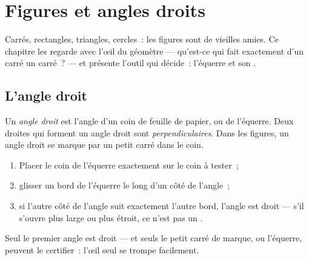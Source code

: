 \chapter{Figures et angles droits}\label{ch:g3:shapes}

Carrés, rectangles, triangles, cercles~: les figures sont de
vieilles amies. Ce chapitre les regarde avec l'œil du
géomètre --- qu'est-ce qui fait exactement d'un carré un
carré~? --- et présente l'outil qui décide~: l'équerre et
son .

\section{L'angle droit}

\begin{definition}\label{def:g3:shapes:rightangle}
Un \emph{angle droit} est l'angle d'un coin de
feuille de papier, ou de l'équerre. Deux droites qui forment un
angle droit sont \emph{perpendiculaires}. Dans les figures, un angle
droit se marque par un petit carré dans le coin.
\end{definition}

\begin{method}\label{met:g3:shapes:check}
\begin{enumerate}
  \item Placer le coin de l'équerre exactement sur le coin à
        tester~;
  \item glisser un bord de l'équerre le long d'un côté de
        l'angle~;
  \item si l'autre côté de l'angle suit exactement l'autre bord,
        l'angle est droit --- s'il s'ouvre plus large ou plus
        étroit, ce n'est pas un .
\end{enumerate}
\end{method}

\begin{omfigure}

{\small Seul le premier angle est droit --- et seuls le petit carré
de marque, ou l'équerre, peuvent le certifier~: l'œil seul se
trompe facilement.}
\end{omfigure}

